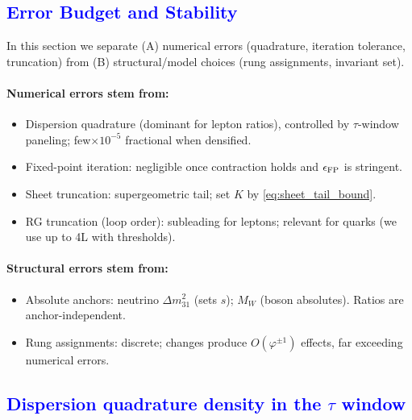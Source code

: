 \documentclass[%
amsmath,amssymb,
aps,
prb,
floatfix,showkeys
]{revtex4-2}
\newcommand{\modif}[1]{\textcolor{blue}{#1}}
\begin{document}
{\modif{\section{Error Budget and Stability}
\label{sec:error_stability}}}

In this section we separate (A) numerical errors (quadrature, iteration tolerance, truncation) from (B) structural/model choices (rung assignments, invariant set).

\paragraph{Numerical errors stem from:}
\begin{itemize}
\item Dispersion quadrature (dominant for lepton ratios), controlled by $\tau$-window paneling; few$\times 10^{-5}$ fractional when densified.
\item Fixed-point iteration: negligible once contraction holds and $\epsilon_{\rm FP}$ is stringent.
\item Sheet truncation: supergeometric tail; set $K$ by \eqref{eq:sheet_tail_bound}.
\item RG truncation (loop order): subleading for leptons; relevant for quarks (we use up to 4L with thresholds).
\end{itemize}

\paragraph{Structural errors stem from:}
\begin{itemize}
\item Absolute anchors: neutrino $\Delta m^2_{31}$ (sets $s$); $M_W$ (boson absolutes). Ratios are anchor-independent.
\item Rung assignments: discrete; changes produce $O(\varphi^{\pm 1})$ effects, far exceeding numerical errors.
\end{itemize}

{\modif{\subsection{Dispersion quadrature density in the $\tau$ window}
\label{subsec:error_tau}}}
\end{document}
